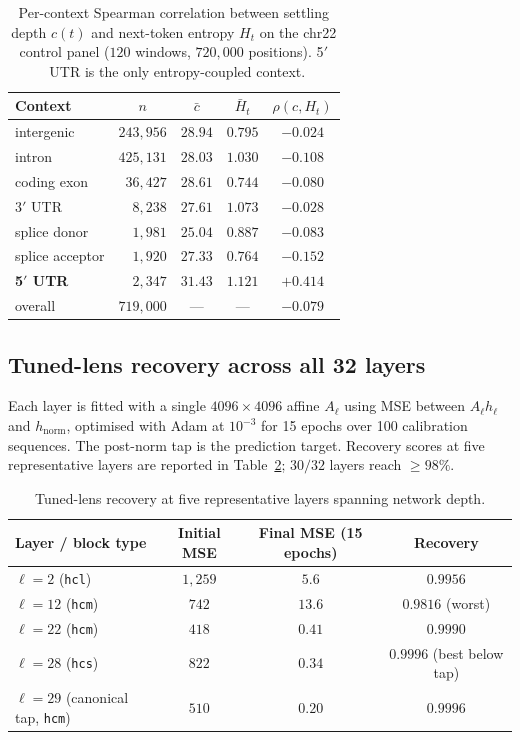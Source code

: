 \documentclass{article}
\theoremstyle{plain}
\theoremstyle{definition}
\theoremstyle{remark}
\newcommand{\hnorm}{h_{\mathrm{norm}}}
\begin{document}
\begin{table}[!htbp]
\caption{Per-context Spearman correlation between settling depth $c(t)$
and next-token entropy $H_t$ on the chr22 control panel
($120$ windows, $720{,}000$ positions). 5$'$~UTR is the only
entropy-coupled context.}
\label{tab:entropy-decoup}
\centering
\small
\begin{tabular}{@{}lcccc@{}}
\toprule
Context & $n$ & $\bar c$ & $\bar H_t$ & $\rho(c, H_t)$ \\
\midrule
intergenic        & $243{,}956$ & $28.94$ & $0.795$ & $-0.024$ \\
intron            & $425{,}131$ & $28.03$ & $1.030$ & $-0.108$ \\
coding exon       & $\phantom{0}36{,}427$ & $28.61$ & $0.744$ & $-0.080$ \\
3$'$ UTR          & $\phantom{00}8{,}238$ & $27.61$ & $1.073$ & $-0.028$ \\
splice donor      & $\phantom{00}1{,}981$ & $25.04$ & $0.887$ & $-0.083$ \\
splice acceptor   & $\phantom{00}1{,}920$ & $27.33$ & $0.764$ & $-0.152$ \\
\textbf{5$'$ UTR} & $\phantom{00}2{,}347$ & $31.43$ & $1.121$ & $\mathbf{+0.414}$ \\
\midrule
overall           & $719{,}000$ & --- & --- & $-0.079$ \\
\bottomrule
\end{tabular}
\end{table}

\subsection{Tuned-lens recovery across all 32 layers}
\label{app:tuned-lens}

Each layer is fitted with a single $4096\times 4096$ affine $A_{\ell}$
using MSE between $A_{\ell} h_{\ell}$ and $\hnorm$, optimised with Adam
at $10^{-3}$ for 15 epochs over 100 calibration sequences. The
post-norm tap is the prediction target. Recovery scores at five
representative layers are reported in Table~\ref{tab:tuned-lens};
$30/32$ layers reach $\ge 98\%$.

\begin{table}[!htbp]
\caption{Tuned-lens recovery at five representative layers spanning
network depth.}
\label{tab:tuned-lens}
\centering
\small
\begin{tabular}{@{}lccc@{}}
\toprule
Layer / block type & Initial MSE & Final MSE (15 epochs) & Recovery \\
\midrule
$\ell=2$ (\texttt{hcl}) & $1{,}259$ & $5.6$ & $0.9956$ \\
$\ell=12$ (\texttt{hcm}) & $742$ & $13.6$ & $0.9816$ (worst) \\
$\ell=22$ (\texttt{hcm}) & $418$ & $0.41$ & $0.9990$ \\
$\ell=28$ (\texttt{hcs}) & $822$ & $0.34$ & $0.9996$ (best below tap) \\
$\ell=29$ (canonical tap, \texttt{hcm}) & $510$ & $0.20$ & $0.9996$ \\
\bottomrule
\end{tabular}
\end{table}
\end{document}
